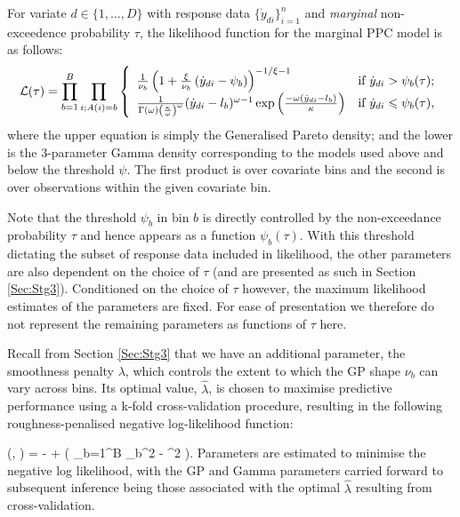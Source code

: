 For variate $d \in \{1,\ldots,D\}$ with response data $\{\dot{y}_{di}\}_{i=1}^{n}$ and \emph{marginal} non-exceedence probability $\tau$, the likelihood function for the marginal PPC model is as follows: 
%
\[
\mathcal{L}(\tau) = \prod_{b=1}^{B}  \prod_{i;A(i)=b} 
\left\{ \begin{array}{ll}
	 \frac{1}{\nu_{b}} \left(1 + \frac{\xi}{\nu_{b}} \left(\dot{y}_{di}-\psi_{b}\right) \right)^{-1/\xi-1} & \mbox{if $\dot{y}_{di}>\psi_{b}(\tau)$};\\
	\frac{1}{\Gamma(\omega)\left(\frac{\kappa}{\omega}\right)^{\omega}} (\dot{y}_{di} - l_{b})^{\omega - 1} \exp \left(\frac{-\omega(\dot{y}_{di}-l_{b})}{\kappa} \right)   & \mbox{if $\dot{y}_{di}\leqslant\psi_{b}(\tau)$},
		\end{array} \right. 
\]
where the upper equation is simply the Generalised Pareto density; and the lower is the 3-parameter Gamma density corresponding to the models used above and below the threshold $\psi$. The first product is over covariate bins and the second is over observations within the given covariate bin. 



Note that the threshold $\psi_{b}$ in bin $b$ is directly controlled by the non-exceedance probability $\tau$ and hence appears as a function $\psi_{b}(\tau)$. With this threshold dictating the subset of response data included in likelihood, the other parameters are also dependent on the choice of $\tau$ (and are presented as such in Section \ref{Sec:Stg3}). Conditioned on the choice of $\tau$ however, the maximum likelihood estimates of the parameters are fixed. For ease of presentation we therefore do not represent the remaining parameters as functions of $\tau$ here.  

Recall from Section \ref{Sec:Stg3} that we have an additional parameter, the smoothness penalty $\lambda$, which controls the extent to which the GP shape $\nu_{b}$ can vary across bins. Its optimal value, $\hat{\lambda}$, is chosen to maximise predictive performance using a k-fold cross-validation procedure, resulting in the following roughness-penalised negative log-likelihood function: 

\pbe
\ell(\tau, \lambda) = - + \lambda \left(  \sum_{b=1}^B \nu_{b}^2 - \left[ \frac{1}{B} \sum_{b=1}^B  \nu_{b} \right]^2 \right).
\pee
Parameters are estimated to minimise the negative log likelihood, with the GP and Gamma parameters carried forward to subsequent inference being those associated with the optimal $\hat{\lambda}$ resulting from cross-validation.  

